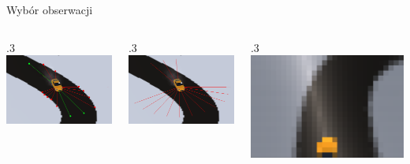 \begin{frame}{Wybór obserwacji}
	\begin{columns}
		\begin{column}{.3\hsize}
			\centering
			\includegraphics[width=\linewidth]{figures/observations_0.png}
		\end{column}
		\begin{column}{.3\hsize}
			\centering
			\includegraphics[width=\linewidth]{figures/observations_1.png}
		\end{column}
		\begin{column}{.3\hsize}
			\centering
			\includegraphics[width=\linewidth]{figures/observations_3.png}
		\end{column}
	\end{columns}
	
\end{frame}
